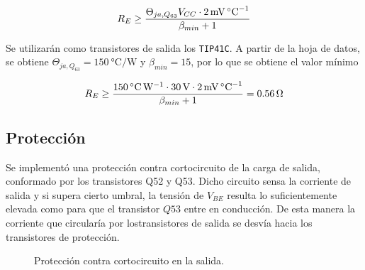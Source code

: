 \begin{equation}
	\centering
	R_E \geq \frac{\Theta_{ja,Q_{63}} V_{CC} \cdot \SI{2}{\milli\volt\per\celsius}}{\beta_{min} + 1}
	\label{ec.re}
\end{equation}
	
	Se utilizarán como transistores de salida los \texttt{TIP41C}. A partir de la hoja de datos, se obtiene $\Theta_{ja,Q_{63}} = \SI{150}{\celsius\per\watt}$ y $\beta_{min} = 15$, por lo que se obtiene el valor mínimo

	\begin{equation}
		\centering
		R_E \geq \frac{ \SI{150}{\celsius\per\watt} \cdot \SI{30}{\volt} \cdot \SI{2}{\milli\volt\per\celsius} }{ \beta_{min} + 1 } = \SI{0.56}{\ohm}
	\end{equation}

	\subsection{Protección}
	Se implementó una protección contra cortocircuito de la carga de salida, conformado por los transistores Q52 y Q53. Dicho circuito sensa la corriente de salida y si supera cierto umbral, la tensión de $V_{BE}$ resulta lo suficientemente elevada como para que el transistor $Q53$ entre en conducción. De esta manera la corriente que circularía por lostransistores de salida se desvía hacia los transistores de protección.

	\begin{figure}[H]
		\centering
		\scalebox{0.5}{}
		\caption{Protección contra cortocircuito en la salida.}
		\label{fig.proteccion}
	\end{figure}


